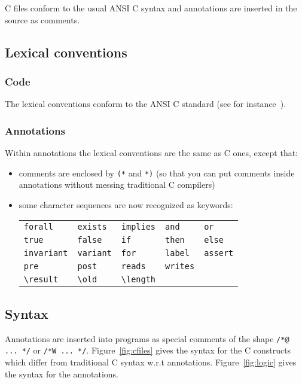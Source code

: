 \documentclass[a4paper,12pt]{report}
\begin{document}
C files conform to the usual ANSI C
syntax and annotations are inserted in the source as comments.

\subsection{Lexical conventions}
\label{lexical:c}

\subsubsection{Code}

The lexical conventions conform to the ANSI C standard (see
for instance~\cite{KR88}).

\subsubsection{Annotations}

Within annotations the lexical conventions are the same as C ones,
except that:
\begin{itemize}
\item comments are enclosed by \texttt{(*} and \texttt{*)} (so that
  you can put comments inside annotations without messing traditional
  C compilers)
\item some character sequences are now recognized as keywords: \par
  \begin{center}
  \begin{tabular}{l@{\qquad}l@{\qquad}l@{\qquad}l@{\qquad}l}
  \verb!forall! & \verb!exists! & \verb!implies! & \verb!and! & \verb!or! \\
  \verb!true! & \verb!false! & \verb!if! & \verb!then! & \verb!else! \\
  \verb!invariant! & \verb!variant! & \verb!for! & \verb!label! & 
  \verb!assert! \\ 
  \verb!pre! & \verb!post! & \verb!reads! & \verb!writes! \\ 
  \verb!\result! & \verb!\old! & \verb!\length!
  \end{tabular}
  \end{center}
\end{itemize}

\subsection{Syntax}

Annotations are inserted into programs as special comments of the shape
\texttt{/*@ ... */} or \texttt{/*W ... */}.
Figure~\ref{fig:cfiles} gives the syntax for the C constructs which
differ from traditional C syntax w.r.t annotations.
Figure~\ref{fig:logic} gives the syntax for the
annotations. 
\end{document}
